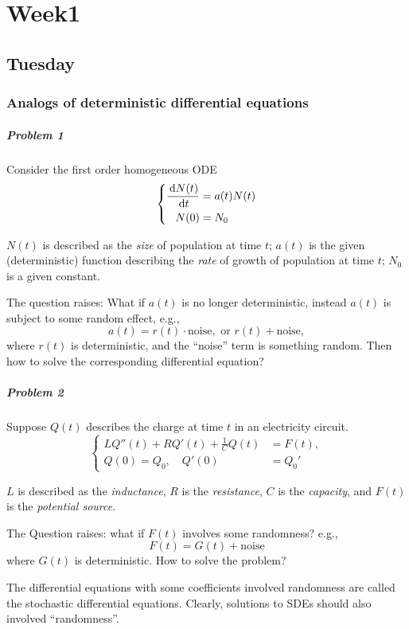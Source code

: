
\chapter{Week1}

\section{Tuesday}
\subsection{Analogs of deterministic differential equations}
\paragraph{Problem 1}
Consider the first order homogeneous ODE
\[
\left\{
\begin{aligned}
\frac{\,\mathrm{d} N(t)}{\,\mathrm{d} t} &= a(t)N(t)\\
N(0)&=N_0
\end{aligned}
\right.
\]

$N(t)$ is described as the \emph{size} of population at time $t$;
$a(t)$ is the given (deterministic) function describing the \emph{rate} of growth of population at time $t$;
$N_0$ is a given constant.

The question raises: What if $a(t)$ is no longer deterministic, instead $a(t)$ is subject to some random effect, e.g.,
\[
a(t) = r(t)\cdot\mbox{noise},
\mbox{ or }
r(t)+\mbox{noise},
\]
where $r(t)$ is deterministic, and the ``noise'' term is something random. Then how to solve the corresponding differential equation?

\paragraph{Problem 2}
Suppose $Q(t)$ describes the charge at time $t$ in an electricity circuit.
\[
\left\{
\begin{aligned}
LQ''(t)+RQ'(t)+\frac{1}{C}Q(t)&=F(t),\\
Q(0)=Q_0,\quad Q'(0)&=Q_0'
\end{aligned}
\right.
\]

$L$ is described as the \emph{inductance}, $R$ is the \emph{resistance}, $C$ is the \emph{capacity}, and $F(t)$ is the \emph{potential source}.

The Question raises: what if $F(t)$ involves some randomness? e.g.,
\[
F(t)=G(t)+\mbox{noise}
\]
where $G(t)$ is deterministic. How to solve the problem?
\begin{remark}
The differential equations with some coefficients involved randomness are called the stochastic differential equations. Clearly, solutions to SDEs should also involved ``randomness''.
\end{remark}
